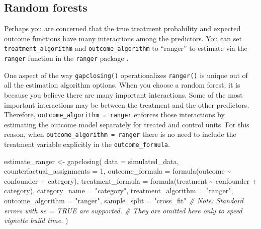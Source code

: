 \documentclass[
]{article}
\newenvironment{Shaded}{\begin{snugshade}}{\end{snugshade}}
\newcommand{\AttributeTok}[1]{\textcolor[rgb]{0.77,0.63,0.00}{#1}}
\newcommand{\CommentTok}[1]{\textcolor[rgb]{0.56,0.35,0.01}{\textit{#1}}}
\newcommand{\DecValTok}[1]{\textcolor[rgb]{0.00,0.00,0.81}{#1}}
\newcommand{\FunctionTok}[1]{\textcolor[rgb]{0.00,0.00,0.00}{#1}}
\newcommand{\NormalTok}[1]{#1}
\newcommand{\OtherTok}[1]{\textcolor[rgb]{0.56,0.35,0.01}{#1}}
\newcommand{\SpecialCharTok}[1]{\textcolor[rgb]{0.00,0.00,0.00}{#1}}
\newcommand{\StringTok}[1]{\textcolor[rgb]{0.31,0.60,0.02}{#1}}
\begin{document}
\hypertarget{random-forests}{%
\subsection{Random forests}\label{random-forests}}

Perhaps you are concerned that the true treatment probability and expected outcome functions have many interactions among the predictors. You can set \texttt{treatment\_algorithm} and \texttt{outcome\_algorithm} to ``ranger'' to estimate via the \texttt{ranger} function in the \texttt{ranger} package \citep{ranger}.

One aspect of the way \texttt{gapclosing()} operationalizes \texttt{ranger()} is unique out of all the estimation algorithm options. When you choose a random forest, it is because you believe there are many important interactions. Some of the most important interactions may be between the treatment and the other predictors. Therefore, \texttt{outcome\_algorithm\ =\ ranger} enforces those interactions by estimating the outcome model separately for treated and control units. For this reason, when \texttt{outcome\_algorithm\ =\ ranger} there is no need to include the treatment variable explicitly in the \texttt{outcome\_formula}.

\begin{Shaded}
\begin{Highlighting}[]
\NormalTok{estimate\_ranger }\OtherTok{\textless{}{-}} \FunctionTok{gapclosing}\NormalTok{(}
  \AttributeTok{data =}\NormalTok{ simulated\_data,}
  \AttributeTok{counterfactual\_assignments =} \DecValTok{1}\NormalTok{,}
  \AttributeTok{outcome\_formula =} \FunctionTok{formula}\NormalTok{(outcome }\SpecialCharTok{\textasciitilde{}}\NormalTok{ confounder }\SpecialCharTok{+}\NormalTok{ category),}
  \AttributeTok{treatment\_formula =} \FunctionTok{formula}\NormalTok{(treatment }\SpecialCharTok{\textasciitilde{}}\NormalTok{ confounder }\SpecialCharTok{+}\NormalTok{ category),}
  \AttributeTok{category\_name =} \StringTok{"category"}\NormalTok{,}
  \AttributeTok{treatment\_algorithm =} \StringTok{"ranger"}\NormalTok{,}
  \AttributeTok{outcome\_algorithm =} \StringTok{"ranger"}\NormalTok{,}
  \AttributeTok{sample\_split =} \StringTok{"cross\_fit"}
  \CommentTok{\# Note: Standard errors with \textasciigrave{}se = TRUE\textasciigrave{} are supported.}
  \CommentTok{\# They are omitted here only to speed vignette build time.}
\NormalTok{)}
\end{Highlighting}
\end{Shaded}
\end{document}
